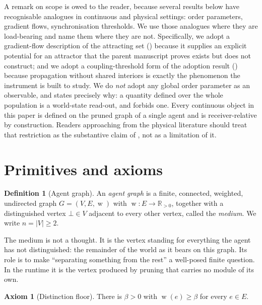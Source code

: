 \documentclass[11pt,a4paper]{article}
\theoremstyle{clstyle}
\theoremstyle{definition}
\newtheorem{definition}[theorem]{Definition}
\newtheorem{axiom}{Axiom}
\theoremstyle{remark}
\DeclareMathOperator{\wt}{w}
\newcommand{\R}{\mathbb{R}}
\newcommand{\flo}{\beta}
\newcommand{\abs}[1]{\lvert#1\rvert}
\newcommand{\med}{\bot}                  %
\begin{document}
A remark on scope is owed to the reader, because several results below have
recognisable analogues in continuous and physical settings: order
parameters, gradient flows, synchronisation thresholds. We use those
analogues where they are load-bearing and name them where they are not.
Specifically, we adopt a gradient-flow description of the attracting set
() because it supplies an explicit potential for an
attractor that the parent manuscript proves exists but does not construct;
and we adopt a coupling-threshold form of the adoption result
() because propagation without shared interiors is
exactly the phenomenon the instrument is built to study. We do \emph{not}
adopt any global order parameter as an observable, and
 states precisely why: a quantity defined over the
whole population is a world-state read-out, and  forbids
one. Every continuous object in this paper is defined on the pruned graph of
a single agent and is receiver-relative by construction. Readers approaching
from the physical literature should treat that restriction as the
substantive claim of , not as a limitation of it.

\section{Primitives and axioms}
\label{sec:axioms}

\begin{definition}[Agent graph]
\label{def:agentgraph}
An \emph{agent graph} is a finite, connected, weighted, undirected graph
$G=(V,E,\wt)$ with $\wt:E\to\R_{>0}$, together with a distinguished vertex
$\med\in V$ adjacent to every other vertex, called the \emph{medium}. We
write $n=\abs{V}\ge 2$.
\end{definition}

The medium is not a thought. It is the vertex standing for everything the
agent has not distinguished: the remainder of the world as it bears on this
graph. Its role is to make ``separating something from the rest'' a
well-posed finite question. In the runtime it is the vertex produced by
pruning that carries no module of its own.

\begin{axiom}[Distinction floor]
\label{ax:floor}
There is $\flo>0$ with $\wt(e)\ge\flo$ for every $e\in E$.
\end{axiom}
\end{document}
